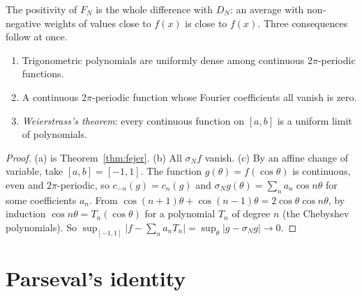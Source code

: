 The positivity of $F_N$ is the whole difference with $D_N$: an average with non-negative weights of values close to $f(x)$
is close to $f(x)$. Three consequences follow at once.

\begin{corollary}\label{cor:fejer}
\begin{enumerate}[label=(\alph*)]
\item Trigonometric polynomials are uniformly dense among continuous $2\pi$-periodic functions.
\item A continuous $2\pi$-periodic function whose Fourier coefficients all vanish is zero.
\item \emph{Weierstrass's theorem}: every continuous function on $[a,b]$ is a uniform limit of polynomials.
\end{enumerate}
\end{corollary}
\begin{proof}
(a) is Theorem~\ref{thm:fejer}. (b) All $\sigma_Nf$ vanish. (c) By an affine change of variable, take $[a,b]=[-1,1]$. The function
$g(\theta)=f(\cos\theta)$ is continuous, even and $2\pi$-periodic, so $c_{-n}(g)=c_n(g)$ and $\sigma_Ng(\theta)=\sum_na_n\cos n\theta$ for some coefficients $a_n$.
From $\cos(n+1)\theta+\cos(n-1)\theta=2\cos\theta\cos n\theta$, by induction $\cos n\theta=T_n(\cos\theta)$ for a polynomial $T_n$ of degree $n$ (the
Chebyshev polynomials). So $\sup_{[-1,1]}\bigl|f-\sum_na_nT_n\bigr|=\sup_\theta|g-\sigma_Ng|\to0$.
\end{proof}

\section{Parseval's identity}

